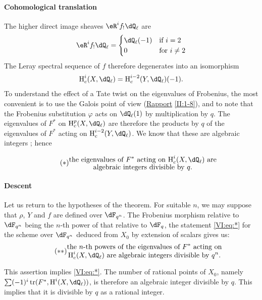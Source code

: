 \paragraph{Cohomological translation}
The higher direct image sheaves $\eR^i f_!\dQ_\ell$ are 
\[
  \eR^i f_!\dQ_\ell = \begin{cases}
                       \dQ_\ell(-1) & \text{if $i = 2$} \\
                       0            & \text{for $i\ne 2$}
                     \end{cases}
\]
The Leray spectral sequence of $f$ therefore degenerates into an isomorphism 
\[
  \h_c^i(X,\dQ_\ell) = \h_c^{i-2}(Y,\dQ_\ell)(-1) \text{.}
\]
To understand the effect of a Tate twist on the eigenvalues of
Frobenius, the most convenient is to use the Galois point of view
(\hyperref[II]{Rapport} \ref{II:1-8}), and to note that the Frobenius
substitution $\varphi$ acts on $\dQ_\ell(1)$ by multiplication by $q$. The
eigenvalues of $F^\ast$ on $\h_c^p(X,\dQ_\ell)$ are therefore the products by
$q$ of the eigenvalues of $F^\ast$ acting on $\h_c^{i-2}(Y,\dQ_\ell)$. We
know that these are algebraic integers \cite[XXI 5.2.2]{sga7}; hence 

\begin{equation*}\tag{$*$}\label{VI:eq:*}
  \substack{\displaystyle\text{the eigenvalues of $F^\ast$ acting on $\h_c^i(X,\dQ_\ell)$ are} \\
  \displaystyle\text{algebraic integers divisible by $q$.}}
\end{equation*}


\paragraph{Descent}
Let us return to the hypotheses of the theorem. For suitable $n$, we may
suppose that $\rho$, $Y$ and $f$ are defined over $\dF_{q^n}$. The
Frobenius morphism relative to $\dF_{q^n}$ being the $n$-th power of that
relative to $\dF_q$, the statement \eqref{VI:eq:*} for the scheme over
$\dF_{q^n}$ deduced from $X_0$ by extension of scalars gives us: 
\begin{equation*}\tag{$**$}\label{VI:eq:**}
  \substack{\displaystyle\text{the $n$-th powers of the eigenvalues of $F^\ast$ acting on} \\ \displaystyle\text{$\h_c^i(X,\dQ_\ell)$ are algebraic integers divisible by $q^n$.}}
\end{equation*}

This assertion implies \eqref{VI:eq:*}. The number of rational points of
$X_0$, namely $\sum (-1)^i \tr(F^\ast,\h^i(X,\dQ_\ell))$, is therefore an
algebraic integer divisible by $q$. This implies that it is divisible by $q$ as
a rational integer. 





